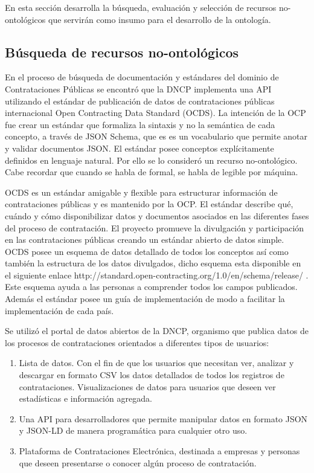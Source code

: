 En esta sección desarrolla la búsqueda, evaluación y selección de recursos no-ontológicos que servirán como insumo para el desarrollo de la ontología.

\subsection{Búsqueda de recursos no-ontológicos }

En el proceso de búsqueda de documentación y estándares del dominio de Contrataciones Públicas se encontró que la DNCP implementa una API utilizando el estándar de publicación de datos de contrataciones públicas internacional Open Contracting Data Standard  (OCDS). La intención de la OCP fue crear un estándar que formaliza la sintaxis y no la semántica de cada concepto, a través de JSON Schema, que es es un vocabulario que permite anotar y validar documentos JSON. El estándar posee conceptos explícitamente definidos en lenguaje natural. Por ello se lo consideró un recurso no-ontológico. Cabe recordar que cuando se habla de formal, se habla de legible por máquina. 

OCDS es un estándar amigable y flexible para estructurar información de contrataciones públicas y es mantenido por la OCP. El estándar describe qué, cuándo y cómo disponibilizar datos y documentos asociados en las diferentes fases del proceso de contratación. El proyecto promueve la divulgación y participación en las contrataciones públicas creando un estándar abierto de datos simple. OCDS posee un esquema de datos detallado de todos los conceptos así como también la estructura de los datos divulgados, dicho esquema esta disponible en el siguiente enlace http://standard.open-contracting.org/1.0/en/schema/release/ . Este esquema ayuda a las personas a comprender todos los campos publicados. Además el estándar posee un guía de implementación de modo a facilitar la implementación de cada país.

Se utilizó el portal de datos abiertos de la DNCP, organismo que publica datos de los procesos de contrataciones orientados a diferentes tipos de usuarios:


\begin{enumerate}
    \item Lista de datos. Con el fin de que los usuarios que necesitan ver, analizar y descargar en formato CSV los datos detallados de todos los registros de contrataciones.
    Visualizaciones de datos para usuarios que deseen ver estadísticas e información agregada.
    \item Una API para desarrolladores que permite manipular datos en formato JSON y JSON-LD de manera programática para cualquier otro uso.
    \item Plataforma de Contrataciones Electrónica, destinada a empresas y personas que deseen presentarse o conocer algún proceso de contratación.

   
    
    
\end{enumerate}


